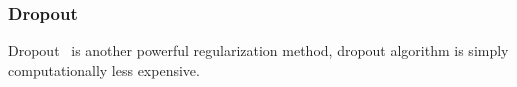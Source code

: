 \subsubsection{Dropout}

Dropout~\cite{JMLR:v15:srivastava14a} is another powerful regularization method, dropout algorithm is simply  computationally less expensive. 